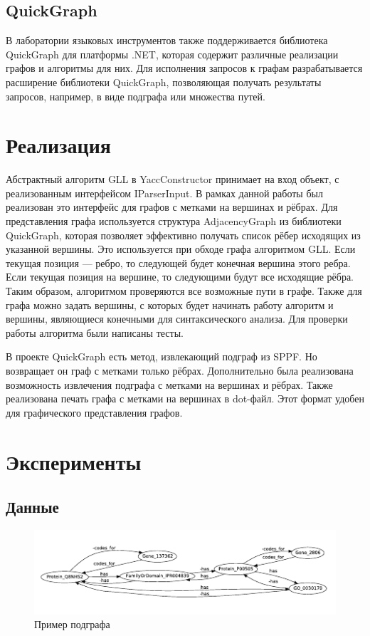 \documentclass[14pt]{matmex-diploma}
\begin{document}
\subsection{QuickGraph}

В лаборатории языковых инструментов также поддерживается библиотека QuickGraph для платформы .NET, которая содержит различные реализации графов и алгоритмы для них. Для исполнения запросов к графам разрабатывается расширение библиотеки QuickGraph, позволяющая получать результаты запросов, например, в виде подграфа или множества путей.

\section{Реализация}
Абстрактный алгоритм GLL в YaccConstructor принимает на вход объект, с реализованным интерфейсом IParserInput. В рамках данной работы был реализован это интерфейс для графов с метками на вершинах и рёбрах. Для представления графа используется структура AdjacencyGraph из библиотеки QuickGraph, которая позволяет эффективно получать список рёбер исходящих из указанной вершины. Это используется при обходе графа алгоритмом GLL. Если текущая позиция --- ребро, то следующей будет конечная вершина этого ребра. Если текущая позиция на вершине, то следующими будут все исходящие рёбра. Таким образом, алгоритмом проверяются все возможные пути в графе. Также для графа можно задать вершины, с которых будет начинать работу алгоритм и вершины, являющиеся конечными для синтаксического анализа. Для проверки работы алгоритма были написаны тесты.

В проекте QuickGraph есть метод, извлекающий подграф из SPPF. Но возвращает он граф с метками только рёбрах. Дополнительно была реализована возможность извлечения подграфа с метками на вершинах и рёбрах. Также реализована печать графа с метками на вершинах в dot-файл. Этот формат удобен для графического представления графов.

\section{Эксперименты}
\subsection{Данные}

\begin{figure}
\centering
\includegraphics[width=16cm]{images/subgraph.pdf}
\caption{Пример подграфа}
\label{subgraph}
\end{figure}
\end{document}
